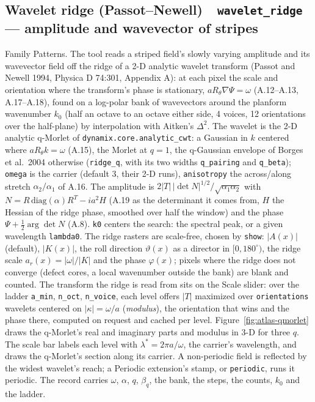 \documentclass[10pt]{article}
\newcommand{\dev}[1]{\texttt{#1}}
\newcommand{\tool}[2]{#1~\textperiodcentered~\dev{#2}}
\begin{document}
\subsection{\tool{Wavelet ridge (Passot--Newell)}{wavelet\_ridge} --- amplitude and wavevector of stripes}\label{sec:wavelet-ridge}
Family Patterns. The tool reads a striped field's
slowly varying amplitude and its wavevector field off the ridge of a 2-D analytic wavelet transform
(Passot and Newell 1994, Physica D 74:301, Appendix A): at each pixel the scale and orientation
where the transform's phase is stationary, $aR_\theta\nabla\Psi = \omega$ (A.12--A.13, A.17--A.18),
found on a log-polar bank of wavevectors around the planform wavenumber $k_0$ (half an octave to an
octave either side, 4 voices, 12 orientations over the half-plane) by interpolation with Aitken's
$\Delta^2$. The wavelet is the 2-D analytic q-Morlet of \texttt{dynamix.core.analytic\_cwt}: a
Gaussian in $k$ centered where $aR_\theta k = \omega$ (A.15), the Morlet at $q = 1$, the q-Gaussian
envelope of Borges et al.\ 2004 otherwise (\texttt{ridge\_q}, with its two widths
\texttt{q\_pairing} and \texttt{q\_beta}); \texttt{omega} is the carrier (default 3, their 2-D
runs), \texttt{anisotropy} the across/along stretch $\alpha_2/\alpha_1$ of A.16. The amplitude is
$2|T|\,|\det N|^{1/2}/\sqrt{\alpha_1\alpha_2}$ with $N = R\,\mathrm{diag}(\alpha)R^T - ia^2H$ (A.19
as the determinant it comes from, $H$ the Hessian of the ridge phase, smoothed over half the window)
and the phase $\Psi + \tfrac12\arg\det N$ (A.8). \texttt{k0} centers the search: the spectral peak,
or a given wavelength \texttt{lambda0}. The ridge rasters are scale-free, chosen by \texttt{show}:
$|A(x)|$ (default), $|K(x)|$, the roll direction $\vartheta(x)$ as a director in $[0, 180^\circ)$,
the ridge scale $a_r(x) = |\omega|/|K|$ and the phase $\varphi(x)$; pixels where the ridge does not
converge (defect cores, a local wavenumber outside the bank) are blank and counted. The transform
the ridge is read from sits on the Scale slider: over the ladder \texttt{a\_min}, \texttt{n\_oct},
\texttt{n\_voice}, each level offers $|T|$ maximized over \texttt{orientations} wavelets centered on
$|\kappa| = \omega/a$ (\emph{modulus}), the orientation that wins and the phase there, computed on
request and cached per level. Figure~\ref{fig:atlas-qmorlet} draws the q-Morlet's real and imaginary
parts and modulus in 3-D for three $q$. The scale bar labels each level with $\lambda^* = 2\pi a/\omega$, the
carrier's wavelength, and draws the q-Morlet's section along its carrier. A non-periodic field is
reflected by the widest wavelet's reach; a Periodic extension's stamp, or \texttt{periodic}, runs it
periodic. The record carries $\omega$, $\alpha$, $q$, $\beta_q$, the bank, the steps, the counts,
$k_0$ and the ladder.
\end{document}
